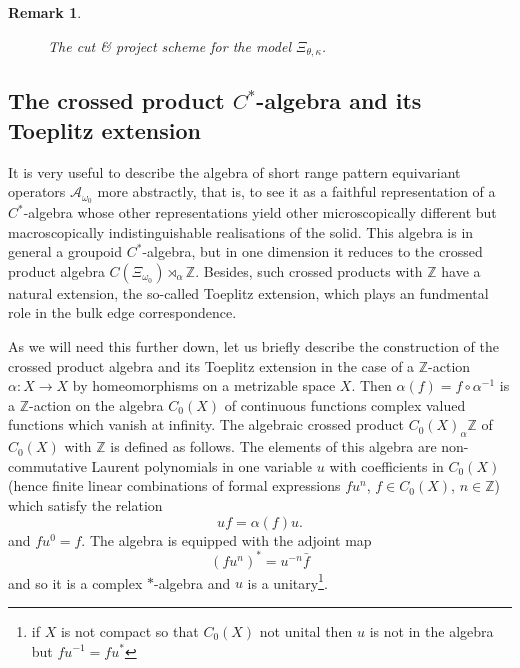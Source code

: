 \documentclass[11pt]{amsart}
\newtheorem*{remark}{Remark}
\newcommand{\Z}{\mathbb{Z}}
\newcommand{\cut}{\kappa}
\begin{document}
\begin{remark}
{\begin{figure}
			\caption{The cut \& project scheme for the model $\Xi_{\theta, \cut}$.}
			\label{CutProj_twoCuts}
		\end{figure}
	}    
\end{remark}


\subsection{\texorpdfstring{The crossed product $C^*$-algebra and its Toeplitz extension}{}}
It is very useful to describe the algebra of short range pattern equivariant operators $\mathcal{A}_{\omega_0}$ more abstractly, that is, to see it as a faithful representation of a $C^*$-algebra whose other representations yield other microscopically different but macroscopically indistinguishable realisations of the solid. This algebra is in general a groupoid $C^*$-algebra, but in one dimension it reduces to the crossed product algebra 
$C(\Xi_{\omega_0})\rtimes_\alpha\Z$. Besides, such crossed products with $\Z$ have a natural extension, the so-called Toeplitz extension, which plays an fundmental role in the bulk edge correspondence.

As we will need this further down, let us briefly describe the construction of 
the crossed product algebra and its Toeplitz extension in the case of a $\Z$-action $\alpha:X\to X$ by homeomorphisms on a metrizable space $X$. 
Then $\alpha(f)=f\circ\alpha^{-1}$ is a $\Z$-action on the algebra $C_0(X)$ of continuous functions complex valued functions which vanish at infinity. The algebraic crossed product $C_0(X)_\alpha\Z$ of $C_0(X)$ with $\Z$ is defined as follows. The elements of this algebra are non-commutative Laurent polynomials in one variable $u$ with coefficients in $C_0(X)$ (hence finite linear combinations of formal expressions $fu^n$, $f \in C_0(X)$, $n\in \Z$) which satisfy the relation
\begin{equation}
	\label{eq:1.1}
	uf=\alpha(f)u.
\end{equation}
and $fu^0=f$. 
The algebra is equipped with the adjoint map 
$$(fu^n)^* = u^{-n}  \bar{f}$$
and so it is a complex $*$-algebra and $u$ is a unitary\footnote{if $X$ is not compact so that $C_0(X)$ not unital then $u$ is not in the algebra but $f u^{-1} = f u^*$}.
\end{document}
